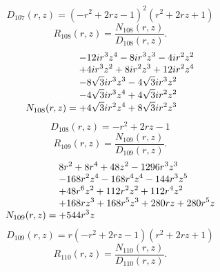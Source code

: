 \documentclass[11pt,a4paper]{article}
\begin{document}
\begin{equation}
D_{107}(r,z)=\left(- r^{2} + 2 r z - 1\right)^{2} \left(r^{2} + 2 r z + 1\right)
\label{eq:cat-denominator-107}
\end{equation}
\begin{equation}
R_{108}(r,z)=\frac{N_{108}(r,z)}{D_{108}(r,z)}.
\label{eq:cat-rational-108}
\end{equation}
\begin{equation}
N_{108}(r,z)=\shortstack[l]{$\displaystyle  - 12 i r^{3} z^{4} - 8 i r^{3} z^{3} - 4 i r^{2} z^{2}$\\
$\displaystyle  + 4 i r^{3} z^{2} + 8 i r^{2} z^{3} + 12 i r^{2} z^{4}$\\
$\displaystyle  - 8 \sqrt{3} i r^{3} z^{3} - 4 \sqrt{3} i r^{3} z^{2}$\\
$\displaystyle  - 4 \sqrt{3} i r^{3} z^{4} + 4 \sqrt{3} i r^{2} z^{2}$\\
$\displaystyle  + 4 \sqrt{3} i r^{2} z^{4} + 8 \sqrt{3} i r^{2} z^{3}$}
\label{eq:cat-numerator-108}
\end{equation}
\begin{equation}
D_{108}(r,z)=- r^{2} + 2 r z - 1
\label{eq:cat-denominator-108}
\end{equation}
\begin{equation}
R_{109}(r,z)=\frac{N_{109}(r,z)}{D_{109}(r,z)}.
\label{eq:cat-rational-109}
\end{equation}
\begin{equation}
N_{109}(r,z)=\shortstack[l]{$\displaystyle 8 r^{2} + 8 r^{4} + 48 z^{2} - 1296 r^{3} z^{3}$\\
$\displaystyle  - 168 r^{2} z^{4} - 168 r^{4} z^{4} - 144 r^{3} z^{5}$\\
$\displaystyle  + 48 r^{6} z^{2} + 112 r^{2} z^{2} + 112 r^{4} z^{2}$\\
$\displaystyle  + 168 r z^{3} + 168 r^{5} z^{3} + 280 r z + 280 r^{5} z$\\
$\displaystyle  + 544 r^{3} z$}
\label{eq:cat-numerator-109}
\end{equation}
\begin{equation}
D_{109}(r,z)=r \left(- r^{2} + 2 r z - 1\right) \left(r^{2} + 2 r z + 1\right)
\label{eq:cat-denominator-109}
\end{equation}
\begin{equation}
R_{110}(r,z)=\frac{N_{110}(r,z)}{D_{110}(r,z)}.
\label{eq:cat-rational-110}
\end{equation}
\end{document}
